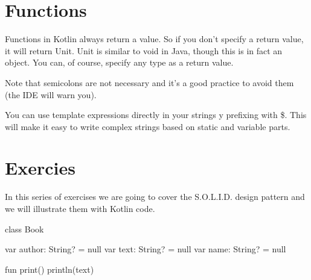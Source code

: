 \section{Functions}
Functions in Kotlin always return a value. So if you don’t specify a return value, it will return Unit.
Unit is similar to void in Java, though this is in fact an object. You can, of course,
specify any type as a return value.

Note that semicolons are not  necessary
and it’s a good practice to avoid them (the IDE will warn you).

You can use template expressions directly in your strings y prefixing with \$. This will make
it easy to write complex strings based on static and variable parts. 

\section{Exercies }
In this series of exercises we are going to cover the S.O.L.I.D. design pattern and we will illustrate them with Kotlin code. 

\begin{kotlin}
class Book {

	var author: String? = null
	var text: String? = null
	var name: String? = null
	
	
	fun print() {
		println(text)
	}	
}
\end{kotlin}


